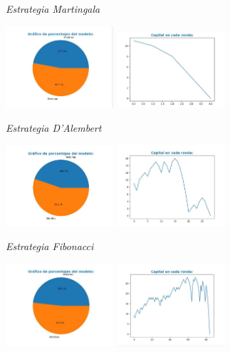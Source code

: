 \documentclass{article}
\begin{document}
    {\itshape\Large Estrategia Martingala \par}

    \includegraphics[width=0.3\textwidth]{mg1.JPG}
    \includegraphics[width=0.3\textwidth]{mg2.JPG}

    \vspace{1cm}

    {\itshape\Large Estrategia D’Alembert \par}

    \includegraphics[width=0.3\textwidth]{dalem1.JPG}
    \includegraphics[width=0.3\textwidth]{dalem2.JPG}

    \vspace{1cm}

    {\itshape\Large Estrategia Fibonacci \par}

    \includegraphics[width=0.3\textwidth]{fibo1.JPG}
    \includegraphics[width=0.3\textwidth]{fibo2.JPG}
\end{document}
